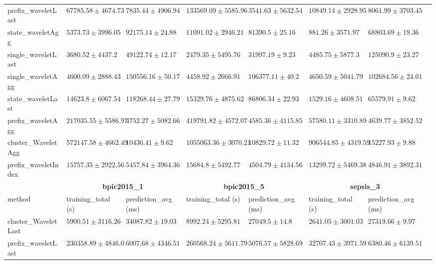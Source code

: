 \documentclass[twoside,11pt]{Latex/Classes/PhDthesisPSnPDF}
\begin{document}
\begin{table}[h]
{\begin{tabular}{llllllll}
		prefix\_waveletLast & $67785.58 \pm 4674.73$ & $7835.44 \pm 4906.94$ & $133569.09 \pm 5585.96$ & $\mathbf{3541.63 \pm 5632.54}$ & $10849.14 \pm 2928.95$ & $8061.99 \pm 3703.45$ \\ 
		state\_waveletAgg & $5373.73 \pm 3996.05$ & $92175.14 \pm 24.88$ & $11091.02 \pm 2946.21$ & $81390.5 \pm 25.16$ & $\mathbf{881.26 \pm 3571.97}$ & $68803.69 \pm 19.36$ \\ 
		single\_waveletLast & $3680.52 \pm 4437.2$ & $49122.74 \pm 12.17$ & $\mathbf{2479.35 \pm 5495.76}$ & $31997.19 \pm 9.23$ & $4485.75 \pm 5877.3$ & $125090.9 \pm 23.27$ \\ 
		single\_waveletAgg & $4600.09 \pm 2888.43$ & $150556.16 \pm 50.17$ & $4458.92 \pm 2666.91$ & $106377.11 \pm 40.2$ & $4650.59 \pm 5041.79$ & $102684.56 \pm 24.01$ \\ 
		state\_waveletLast & $14623.8 \pm 6067.54$ & $118268.44 \pm 27.79$ & $15329.76 \pm 4875.62$ & $86806.34 \pm 22.93$ & $1529.16 \pm 4608.51$ & $65579.91 \pm 9.62$ \\ 
		prefix\_waveletAgg & $217035.55 \pm 5586.97$ & $\mathbf{4752.27 \pm 5082.66}$ & $419791.82 \pm 4572.07$ & $4585.36 \pm 4115.85$ & $57580.11 \pm 3310.89$ & $\mathbf{4639.77 \pm 3852.52}$ \\ 
		cluster\_WaveletAgg & $572147.58 \pm 4662.49$ & $10436.41 \pm 9.62$ & $1055063.36 \pm 3070.21$ & $10829.72 \pm 11.32$ & $906544.85 \pm 4319.59$ & $15227.93 \pm 9.88$ \\ 
		prefix\_waveletIndex & $15757.35 \pm 2922.56$ & $5457.84 \pm 3964.36$ & $15684.8 \pm 5492.77$ & $4504.79 \pm 4134.56$ & $13299.72 \pm 5469.38$ & $4846.91 \pm 3892.31$ \\ 
		\bottomrule
		\toprule
		& \multicolumn{2}{c}{{\bfseries bpic2015\_1}} & \multicolumn{2}{c}{{\bfseries bpic2015\_5}} & \multicolumn{2}{c}{{\bfseries sepsis\_3}} \\ \cmidrule(lr){2-3} \cmidrule(lr){4-5} \cmidrule(lr){6-7}
		method  & training\_total (s) & prediction\_avg (ms) & training\_total (s) & prediction\_avg (ms) & training\_total (s) & prediction\_avg (ms) \\ \midrule
		cluster\_WaveletLast & $5900.51 \pm 3116.26$ & $34087.82 \pm 19.03$ & $8992.24 \pm 5295.81$ & $27049.5 \pm 14.8$ & $2641.05 \pm 3001.03$ & $27319.66 \pm 9.97$ \\ 
		prefix\_waveletLast & $230358.89 \pm 4846.0$ & $6007.68 \pm 4346.51$ & $260568.24 \pm 5611.79$ & $5076.57 \pm 5828.69$ & $32707.43 \pm 3971.59$ & $6380.46 \pm 6139.51$ \\ 
		

\end{tabular}}
\end{table}
\end{document}
